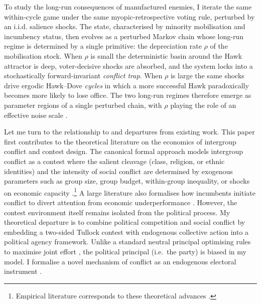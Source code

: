 \documentclass[11pt,twoside]{extarticle}
\begin{document}
To study the long-run consequences of manufactured enemies, I iterate the same within-cycle game under the same myopic-retrospective voting rule, perturbed by an i.i.d. salience shocks. The state, characterised by minority mobilisation and incumbency status, then evolves as a perturbed Markov chain whose long-run regime is determined by a single primitive: the depreciation rate $\rho$ of the mobilisation stock. When $\rho$ is small the deterministic basin around the Hawk attractor is deep, voter-decisive shocks are absorbed, and the system locks into a stochastically forward-invariant \emph{conflict trap}. When $\rho$ is large the same shocks drive ergodic Hawk--Dove \emph{cycles} in which a more successful Hawk paradoxically becomes more likely to lose office. The two long-run regimes therefore emerge as parameter regions of a single perturbed chain, with $\rho$ playing the role of an effective noise scale \citep*{youngEvolutionConventions1993,youngIndividualStrategySocial1998a}. 


Let me turn to the relationship to and departures from existing work. This paper first contributes to the theoretical literature on the economics of intergroup conflict and contest design.
The canonical formal approach models intergroup conflict as a contest where the salient cleavage (class, religion, or ethnic identities) and the intensity of social conflict are determined by exogenous parameters such as group size, group budget, within-group inequality, or shocks on economic capacity \citep*{estebanConflictDistribution1999, estebanSalienceEthnicConflict2008, caselliTheoryEthnicConflict2006, acharyaElectoralCampaignsDynamic2024}.\footnote{Empirical literature corresponds to these theoretical advances \citep{dalbóWORKERSWARRIORSCRIMINALS2011, rohnerWarSignalsTheory2013, dubeCommodityPriceShocks2013}.} 
A large literature also formalises how incumbents initiate conflict to divert attention from economic underperformance \citep*{hessWarDemocracy2001}. 
However, the contest environment itself remains isolated from the political process. 
My theoretical departure is to combine political competition and social conflict by embedding a two-sided Tullock contest with endogenous collective action into a political agency framework.
Unlike a standard neutral principal optimising rules to maximise joint effort \citep*{skaperdasContestSuccessFunctions1996,jiaStochasticDerivationRatio2008,barutSymmetricMultiplePrize1998,fangTurningHeatDiscouraging2020}, the political principal (i.e.\ the party) is biased in my model. 
I formalise a novel mechanism of conflict as an endogenous electoral instrument \citep{iyerReligiousRiotsElectoral2018, mitraImplicationsEconomicTheory2014}.
\end{document}
